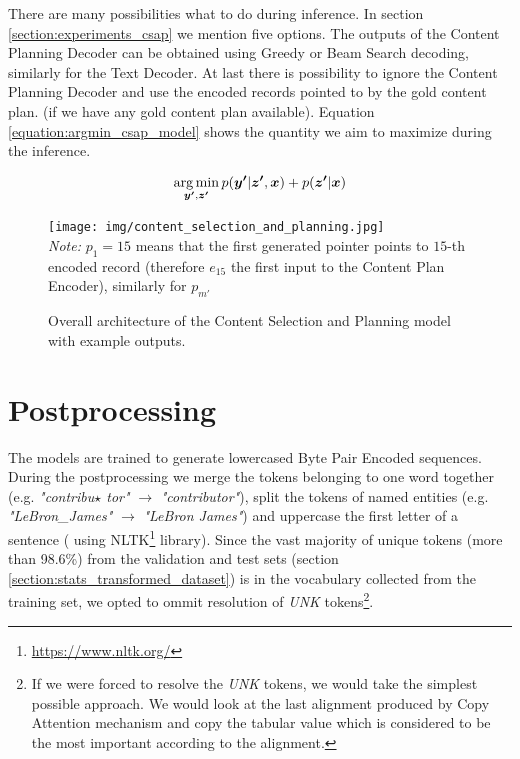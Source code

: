 There are many possibilities what to do during inference. In section \ref{section:experiments_csap} we mention five options. The outputs of the Content Planning Decoder can be obtained using Greedy or Beam Search decoding, similarly for the Text Decoder. At last there is possibility to ignore the Content Planning Decoder and use the encoded records pointed to by the gold content plan. (if we have any gold content plan available). Equation \ref{equation:argmin_csap_model} shows the quantity we aim to maximize during the inference.

\begin{equation} \label{equation:argmin_csap_model}
    \operatorname*{arg\,min}_{\boldsymbol{y'}, \boldsymbol{z'}}{p(\boldsymbol{y'}|\boldsymbol{z'}, \boldsymbol{x}) + p(\boldsymbol{z'} | \boldsymbol{x})}
\end{equation}

\begin{figure}[!h]
    \centering
    \texttt{[image: img/content\_selection\_and\_planning.jpg]}
    \footnotesize{\\ \textit{Note:} $p_1 = 15$ means that the first generated pointer points to $15$-th encoded record (therefore $e_{15}$ the first input to the Content Plan Encoder), similarly for $p_{m'}$}
    \caption{Overall architecture of the Content Selection and Planning model with example outputs.} \label{figure:overal_architecture_csap}
\end{figure}

\section{Postprocessing}

The models are trained to generate lowercased Byte Pair Encoded sequences. During the postprocessing we merge the tokens belonging to one word together (e.g. \emph{"contribu$\star$ tor"} $\rightarrow$ \emph{"contributor"}), split the tokens of named entities (e.g. \emph{"LeBron\_James"} $\rightarrow$ \emph{"LeBron James"}) and uppercase the first letter of a sentence ( using NLTK\footnote{\url{https://www.nltk.org/}} library). Since the vast majority of unique tokens (more than 98.6\%) from the validation and test sets (section \ref{section:stats_transformed_dataset}) is in the vocabulary collected from the training set, we opted to ommit resolution of \emph{UNK} tokens\footnote{If we were forced to resolve the \emph{UNK} tokens, we would take the simplest possible approach. We would look at the last alignment produced by Copy Attention mechanism and copy the tabular value which is considered to be the most important according to the alignment. }.